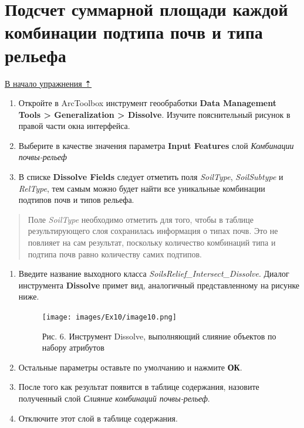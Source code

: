 \documentclass[12pt,]{book}
\begin{document}
\hypertarget{overlay-sumarea-combination}{%
\section{Подсчет суммарной площади каждой комбинации подтипа почв и типа рельефа}\label{overlay-sumarea-combination}}

\protect\hyperlink{overlay}{В начало упражнения ⇡}

\begin{enumerate}
\def\labelenumi{\arabic{enumi}.}
\item
  Откройте в ArcToolbox инструмент геообработки \textbf{Data Management Tools \textgreater{} Generalization \textgreater{} Dissolve}. Изучите пояснительный рисунок в правой части окна интерфейса.
\item
  Выберите в качестве значения параметра \textbf{Input Features} слой \emph{Комбинации почвы-рельеф}
\item
  В списке \textbf{Dissolve Fields} следует отметить поля \emph{SoilType}, \emph{SoilSubtype} и \emph{RelType}, тем самым можно будет найти все уникальные комбинации подтипов почв и типов рельефа.
\end{enumerate}

\begin{quote}
Поле \emph{SoilType} необходимо отметить для того, чтобы в таблице результирующего слоя сохранилась информация о типах почв. Это не повлияет на сам результат, поскольку количество комбинаций типа и подтипа почв равно количеству самих подтипов.
\end{quote}

\begin{enumerate}
\def\labelenumi{\arabic{enumi}.}
\setcounter{enumi}{3}
\item
  Введите название выходного класса \emph{SoilsRelief\_Intersect\_Dissolve}. Диалог инструмента \textbf{Dissolve} примет вид, аналогичный представленному на рисунке ниже.

  \begin{figure}
  \centering
  \texttt{[image: images/Ex10/image10.png]}
  \caption{Рис. 6. Инструмент Dissolve, выполняющий слияние объектов по набору атрибутов}
  \end{figure}
\item
  Остальные параметры оставьте по умолчанию и нажмите \textbf{ОК}.
\item
  После того как результат появится в таблице содержания, назовите полученный слой \emph{Слияние комбинаций почвы-рельеф}.
\item
  Отключите этот слой в таблице содержания.
\end{enumerate}
\end{document}

